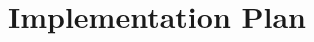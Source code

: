 \section{Implementation Plan}

\nocite{rankanduni}
\nocite{dph}

\begin{comment}
Data rank is simply the rank of a collection, and scalar values are considered to be collections of rank 0.
Thus, the rank of some regular collection is a non-negative integer.%
Function rank is a rank 1 collection of each of the associated data rank values of a function's expected arguments, usually with some value to represent when the function can take data of any rank for a specific argument.
\end{comment}

